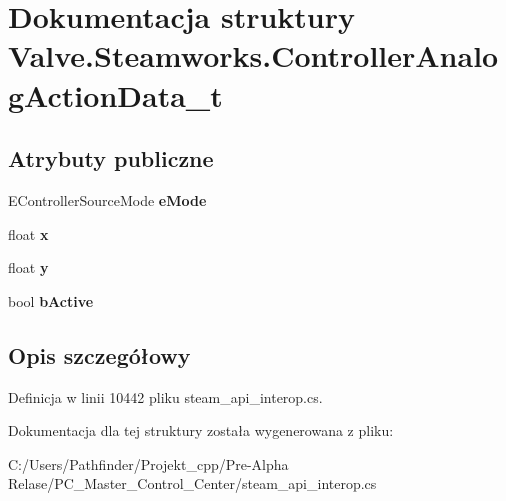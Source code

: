 \hypertarget{struct_valve_1_1_steamworks_1_1_controller_analog_action_data__t}{}\section{Dokumentacja struktury Valve.\+Steamworks.\+Controller\+Analog\+Action\+Data\+\_\+t}
\label{struct_valve_1_1_steamworks_1_1_controller_analog_action_data__t}
\subsection*{Atrybuty publiczne}
\begin{DoxyCompactItemize}
\item 
\mbox{\label{struct_valve_1_1_steamworks_1_1_controller_analog_action_data__t_a41ae36813ae95fe32b2d7e4ef4c5894e}} 
E\+Controller\+Source\+Mode {\bfseries e\+Mode}
\item 
\mbox{\label{struct_valve_1_1_steamworks_1_1_controller_analog_action_data__t_ad7e6d626c8c7077a9422ae171fa5035b}} 
float {\bfseries x}
\item 
\mbox{\label{struct_valve_1_1_steamworks_1_1_controller_analog_action_data__t_a96e36404f7635d6fcf067132718d20fe}} 
float {\bfseries y}
\item 
\mbox{\label{struct_valve_1_1_steamworks_1_1_controller_analog_action_data__t_a098fd92889adeccb9f16a6e2c25cf2ee}} 
bool {\bfseries b\+Active}
\end{DoxyCompactItemize}


\subsection{Opis szczegółowy}


Definicja w linii 10442 pliku steam\+\_\+api\+\_\+interop.\+cs.



Dokumentacja dla tej struktury została wygenerowana z pliku\+:\begin{DoxyCompactItemize}
\item 
C\+:/\+Users/\+Pathfinder/\+Projekt\+\_\+cpp/\+Pre-\/\+Alpha Relase/\+P\+C\+\_\+\+Master\+\_\+\+Control\+\_\+\+Center/steam\+\_\+api\+\_\+interop.\+cs\end{DoxyCompactItemize}
